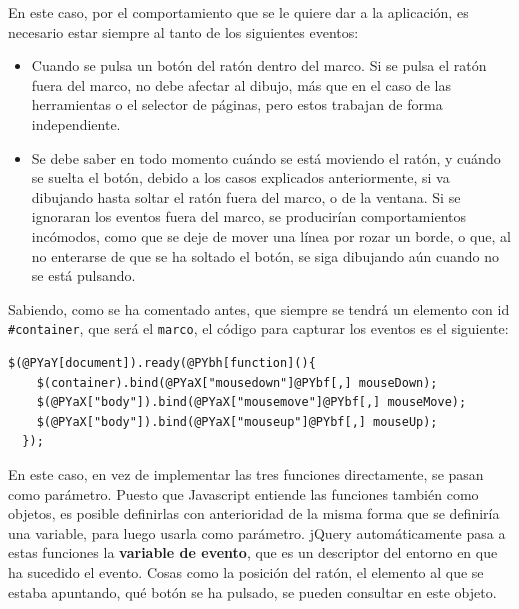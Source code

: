 En este caso, por el comportamiento que se le quiere dar a la aplicación, es necesario estar siempre al tanto de los siguientes eventos:
\begin{itemize}
  \item Cuando se pulsa un botón del ratón dentro del marco. Si se pulsa el ratón fuera del marco, no debe afectar al dibujo, más que en el caso de las herramientas o el selector de páginas, pero estos trabajan de forma independiente.
  \item Se debe saber en todo momento cuándo se está moviendo el ratón, y cuándo se suelta el botón, debido a los casos explicados anteriormente, si va dibujando hasta soltar el ratón fuera del marco, o de la ventana. Si se ignoraran los eventos fuera del marco, se producirían comportamientos incómodos, como que se deje de mover una línea por rozar un borde, o que, al no enterarse de que se ha soltado el botón, se siga dibujando aún cuando no se está pulsando.
\end{itemize}

Sabiendo, como se ha comentado antes, que siempre se tendrá un elemento con id \texttt{\#container}, que será el \texttt{marco}, el código para capturar los eventos es el siguiente:

\begin{Verbatim}[commandchars=@\[\]]
  $(@PYaY[document]).ready(@PYbh[function](){
    $(container).bind(@PYaX["mousedown"]@PYbf[,] mouseDown);
    $(@PYaX["body"]).bind(@PYaX["mousemove"]@PYbf[,] mouseMove);
    $(@PYaX["body"]).bind(@PYaX["mouseup"]@PYbf[,] mouseUp);
  });
\end{Verbatim}


En este caso, en vez de implementar las tres funciones directamente, se pasan como parámetro. Puesto que Javascript entiende las funciones también como objetos, es posible definirlas con anterioridad de la misma forma que se definiría una variable, para luego usarla como parámetro. jQuery automáticamente pasa a estas funciones la \textbf{variable de evento}, que es un descriptor del entorno en que ha sucedido el evento. Cosas como la posición del ratón, el elemento al que se estaba apuntando, qué botón se ha pulsado, se pueden consultar en este objeto.

